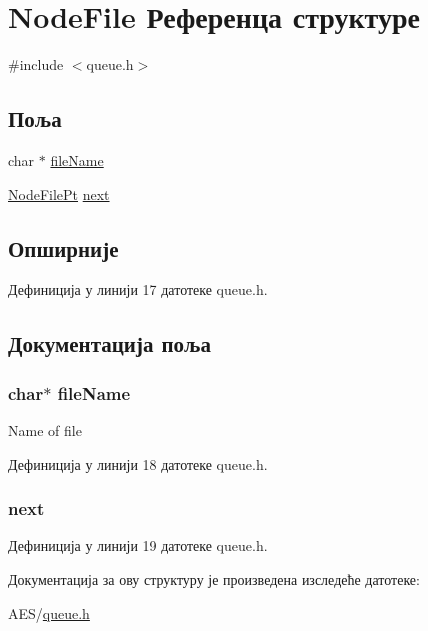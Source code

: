 \hypertarget{struct_node_file}{\section{Node\+File Референца структуре}
\label{struct_node_file}
}


{\ttfamily \#include $<$queue.\+h$>$}

\subsection*{Поља}
\begin{DoxyCompactItemize}
\item 
char $\ast$ \hyperlink{struct_node_file_a25c8761bc1f523fe6a53db546ae83add}{file\+Name}
\item 
\hyperlink{queue_8h_a21054bd6fff2213f6e09f4e5b11300b9}{Node\+File\+Pt} \hyperlink{struct_node_file_a6e3ae14a411e5a0f5573bd9deb9b4a43}{next}
\end{DoxyCompactItemize}


\subsection{Опширније}


Дефиниција у линији 17 датотеке queue.\+h.



\subsection{Документација поља}
\hypertarget{struct_node_file_a25c8761bc1f523fe6a53db546ae83add}{
\subsubsection[{file\+Name}]{\setlength{\rightskip}{0pt plus 5cm}char$\ast$ file\+Name}}\label{struct_node_file_a25c8761bc1f523fe6a53db546ae83add}
Name of file 

Дефиниција у линији 18 датотеке queue.\+h.

\hypertarget{struct_node_file_a6e3ae14a411e5a0f5573bd9deb9b4a43}{
\subsubsection[{next}]{ next}}\label{struct_node_file_a6e3ae14a411e5a0f5573bd9deb9b4a43}


Дефиниција у линији 19 датотеке queue.\+h.



Документација за ову структуру је произведена изследеће датотеке\+:\begin{DoxyCompactItemize}
\item 
A\+E\+S/\hyperlink{queue_8h}{queue.\+h}\end{DoxyCompactItemize}
